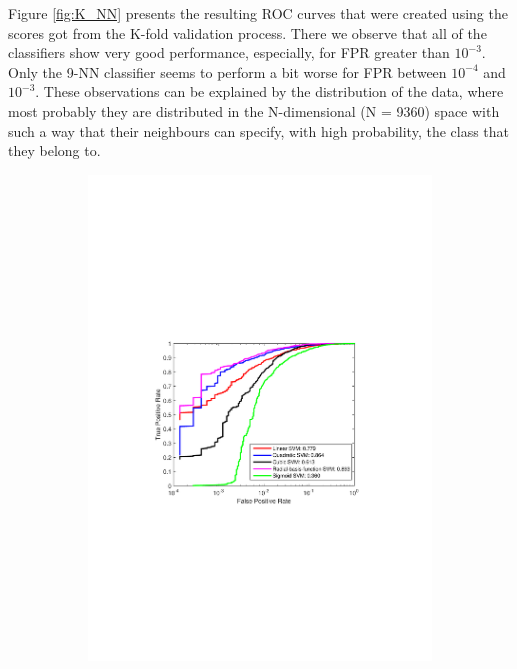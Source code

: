 \noindent Figure \ref{fig:K_NN} presents the resulting ROC curves that were created using the scores got from the K-fold validation process. There we observe that all of the classifiers show very good performance, especially, for FPR greater than $10^{-3}$. Only the 9-NN classifier seems to perform a bit worse for FPR between $10^{-4}$ and $10^{-3}$. These observations can be explained by the distribution of the data, where most probably they are distributed in the N-dimensional (N = 9360) space with such a way that their neighbours can specify, with high probability, the class that they belong to.

\begin{figure}[h]
  \centering
  \begin{subfigure}[b]{0.49\textwidth}
   \includegraphics[width=\textwidth]{figures/SVM.pdf}
    \caption{}
    \label{fig:SVM}
  \end{subfigure}

\end{figure}
